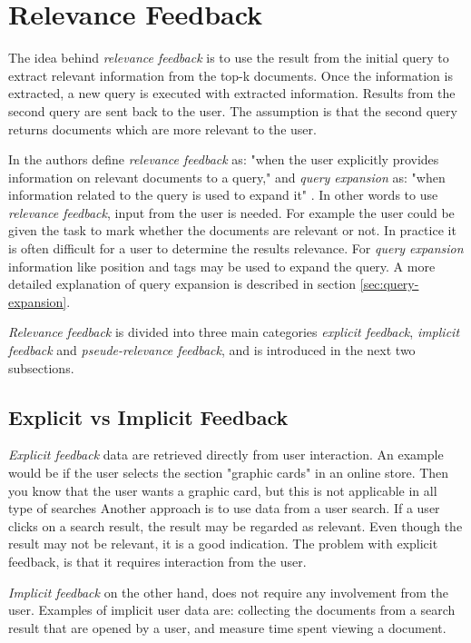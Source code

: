 \section{Relevance Feedback}
The idea behind \textit{relevance feedback} is to use the result from the initial query to extract relevant information from the top-k documents.
Once the information is extracted, a new query is executed with extracted information.
Results from the second query are sent back to the user.
The assumption is that the second query returns documents which are more relevant to the user.

In \cite{ir-book} the authors define \textit{relevance feedback} as: "when the user explicitly provides information on relevant documents to a query,"
and \textit{query expansion} as: "when information related to the query is used to expand it" \cite[p. 177]{ir-book}.
In other words to use \textit{relevance feedback}, input from the user is needed.
For example the user could be given the task to mark whether the documents are relevant or not.
In practice it is often difficult for a user to determine the results relevance.
For \textit{query expansion} information like position and tags may be used to expand the query.
A more detailed explanation of query expansion is described in section \ref{sec:query-expansion}.

\textit{Relevance feedback} is divided into three main categories \textit{explicit feedback}, \textit{implicit feedback} and \textit{pseude-relevance feedback},
and is introduced in the next two subsections.

\subsection{Explicit vs Implicit Feedback}
\textit{Explicit feedback} data are retrieved directly from user interaction.
An example would be if the user selects the section "graphic cards" in an online store.
Then you know that the user wants a graphic card, but this is not applicable in all type of searches
Another approach is to use data from a user search.
If a user clicks on a search result, the result may be regarded as relevant.
Even though the result may not be relevant, it is a good indication.
The problem with explicit feedback, is that it requires interaction from the user.

\textit{Implicit feedback} on the other hand, does not require any involvement from the user.
Examples of implicit user data are:
collecting the documents from a search result that  are opened by a user,
and measure time spent viewing a document.

